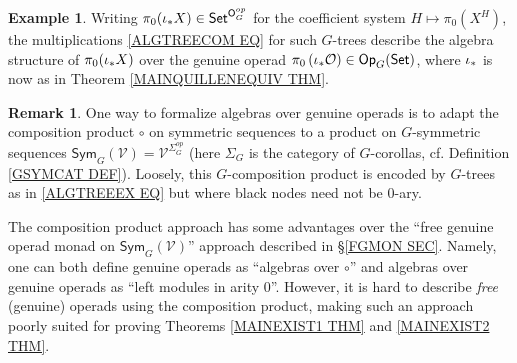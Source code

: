 \documentclass[a4paper,10pt
,draft
]{article}%
\numberwithin{equation}{section}
\numberwithin{figure}{section}
\theoremstyle{definition} %
\newtheorem{example}[equation]{Example}%
\newtheorem{remark}[equation]{Remark}%
\newcommand{\set}[1]{\left\{#1\right\}}%
\DeclareMathOperator{\Ran}{Ran}%
\newcommand{\V}{\ensuremath{\mathcal V}}
\renewcommand{\P}{\ensuremath{\mathcal P}}
\newcommand{\1}{\ensuremath{\mathbbm 1}}%
\begin{document}
\begin{example}
Writing 
$\pi_0 (\iota_{\**} X) \in \mathsf{Set}^{\mathsf{O}_G^{op}}$
for the coefficient system
$H \mapsto \pi_0 (X^H)$,
the multiplications \eqref{ALGTREECOM EQ} for such $G$-trees  
describe the algebra structure of 
$\pi_0 (\iota_{\**} X)$
over the genuine operad
$\pi_0 \left(\iota_{\**} \mathcal{O} \right) \in
\mathsf{Op}_G(\mathsf{Set})$,
where $\iota_{\**}$ is now as in Theorem \ref{MAINQUILLENEQUIV THM}.
\end{example}


\begin{remark}
	One way to formalize algebras over genuine operads
	is to adapt the composition product $\circ$ on symmetric sequences
	\cite[Def. 1.4]{GJ94}
	to a product on $G$-symmetric sequences $\mathsf{Sym}_G(\mathcal{V}) = 
	\mathcal{V}^{\Sigma_G^{op}}$
	(here $\Sigma_G$ is the category of $G$-corollas, 
	cf. Definition \ref{GSYMCAT DEF}).
%
	Loosely, this $G$-composition product is encoded by $G$-trees as in \eqref{ALGTREEEX EQ} but where black nodes need not be $0$-ary.
	
	The composition product approach has some advantages over the
	``free genuine operad monad on $\mathsf{Sym}_G(\mathcal{V})$''
	approach described in \S \ref{FGMON SEC}.
	Namely, one can both define genuine operads as ``algebras over $\circ$''
	and algebras over genuine operads as ``left modules in arity $0$''.
	However, it is hard to describe 
	\emph{free} (genuine) operads using the composition product, 
	making such an approach poorly suited 
	for proving Theorems \ref{MAINEXIST1 THM} and \ref{MAINEXIST2 THM}.
\end{remark}
\end{document}
